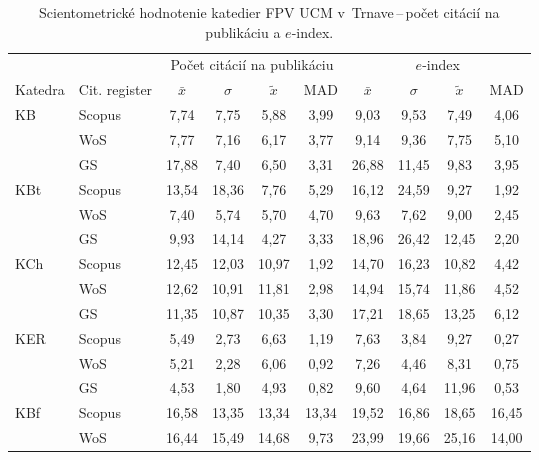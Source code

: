 \begin{table}
  \centering\small
  \caption[Hodnotenie FPV\,--\,počet citácií na publikáciu a $e$-index]%
  {Scientometrické hodnotenie katedier FPV UCM v~Trnave\,--\,počet citácií na
    publikáciu a $e$-index.}
  \label{tab:2-staff.results}
  \begin{tabularx}{\textwidth}{XXcccc@{\hspace{3ex}}cccc}
    \toprule\noalign{\vspace{.3ex}}
    & & \multicolumn{4}{c}{Počet citácií na publikáciu} & \multicolumn{4}{c}{$e$-index} \\
    \cmidrule{3-6}\cmidrule{7-10}
    Katedra  & Cit. register & $\bar{x}$ & $\sigma$  & $\tilde{x}$ & MAD & $\bar{x}$ & $\sigma$ & $\tilde{x}$  & MAD \\[0.3ex]
    \midrule\noalign{\vspace{.5ex}}
    KB   & Scopus & 7,74  & 7,75  & 5,88  & 3,99  & 9,03  & 9,53  & 7,49  & 4,06  \\
         & WoS    & 7,77  & 7,16  & 6,17  & 3,77  & 9,14  & 9,36  & 7,75  & 5,10  \\
         & GS     & 17,88 & 7,40  & 6,50  & 3,31  & 26,88 & 11,45 & 9,83  & 3,95  \\[3ex]
    KBt  & Scopus & 13,54 & 18,36 & 7,76  & 5,29  & 16,12 & 24,59 & 9,27  & 1,92  \\
         & WoS    & 7,40  & 5,74  & 5,70  & 4,70  & 9,63  & 7,62  & 9,00  & 2,45  \\
         & GS     & 9,93  & 14,14 & 4,27  & 3,33  & 18,96 & 26,42 & 12,45 & 2,20  \\[3ex]
    KCh  & Scopus & 12,45 & 12,03 & 10,97 & 1,92  & 14,70 & 16,23 & 10,82 & 4,42  \\
         & WoS    & 12,62 & 10,91 & 11,81 & 2,98  & 14,94 & 15,74 & 11,86 & 4,52  \\
         & GS     & 11,35 & 10,87 & 10,35 & 3,30  & 17,21 & 18,65 & 13,25 & 6,12  \\[3ex]
    KER  & Scopus & 5,49  & 2,73  & 6,63  & 1,19  & 7,63  & 3,84  & 9,27  & 0,27  \\
         & WoS    & 5,21  & 2,28  & 6,06  & 0,92  & 7,26  & 4,46  & 8,31  & 0,75  \\
         & GS     & 4,53  & 1,80  & 4,93  & 0,82  & 9,60  & 4,64  & 11,96 & 0,53  \\[3ex]
    KBf  & Scopus & 16,58 & 13,35 & 13,34 & 13,34 & 19,52 & 16,86 & 18,65 & 16,45 \\
         & WoS    & 16,44 & 15,49 & 14,68 & 9,73  & 23,99 & 19,66 & 25,16 & 14,00 \\

\end{tabularx}
\end{table}
